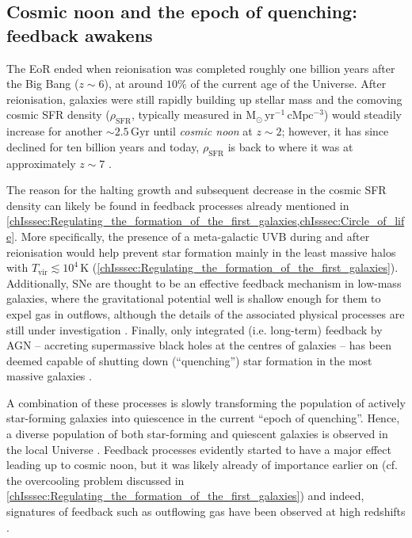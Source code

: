 \subsection{Cosmic noon and the epoch of quenching: feedback awakens}
\label{chIssec:Cosmic_noon_and_the_epoch_of_quenching}

The EoR ended when reionisation was completed roughly one billion years after the Big Bang ($z \sim 6$), at around $10\%$ of the current age of the Universe. After reionisation, galaxies were still rapidly building up stellar mass and the comoving cosmic SFR density ($\rho_\text{SFR}$, typically measured in $\mathrm{M_\odot \, yr^{-1} \, cMpc^{-3}}$) would steadily increase for another $\sim 2.5 \, \mathrm{Gyr}$ until \textit{cosmic noon} at $z \sim 2$; however, it has since declined for ten billion years and today, $\rho_\text{SFR}$ is back to where it was at approximately $z \sim 7$ \citep{2014ARA&A..52..415M}.

The reason for the halting growth and subsequent decrease in the cosmic SFR density can likely be found in feedback processes already mentioned in \cref{chIsssec:Regulating_the_formation_of_the_first_galaxies,chIsssec:Circle_of_life}. More specifically, the presence of a meta-galactic UVB during and after reionisation \citep{2012ApJ...746..125H} would help prevent star formation mainly in the least massive halos with $T_\text{vir} \lesssim 10^4 \, \mathrm{K}$ (\cref{chIsssec:Regulating_the_formation_of_the_first_galaxies}). Additionally, SNe are thought to be an effective feedback mechanism in low-mass galaxies, where the gravitational potential well is shallow enough for them to expel gas in outflows, although the details of the associated physical processes are still under investigation \citep{2015MNRAS.446..521S, 2019MNRAS.485.3317S, 2022MNRAS.511.1247R}. Finally, only integrated (i.e. long-term) feedback by AGN -- accreting supermassive black holes at the centres of galaxies -- has been deemed capable of shutting down (``quenching'') star formation in the most massive galaxies \citep[e.g.][]{2022MNRAS.514..313B, 2022MNRAS.512.1052P}.

A combination of these processes is slowly transforming the population of actively star-forming galaxies into quiescence in the current ``epoch of quenching''. Hence, a diverse population of both star-forming and quiescent galaxies is observed in the local Universe \citep{2010ApJ...721..193P}. Feedback processes evidently started to have a major effect leading up to cosmic noon, but it was likely already of importance earlier on (cf. the overcooling problem discussed in \cref{chIsssec:Regulating_the_formation_of_the_first_galaxies}) and indeed, signatures of feedback such as outflowing gas have been observed at high redshifts \citep[e.g.][]{2022ApJ...934...64A}.

